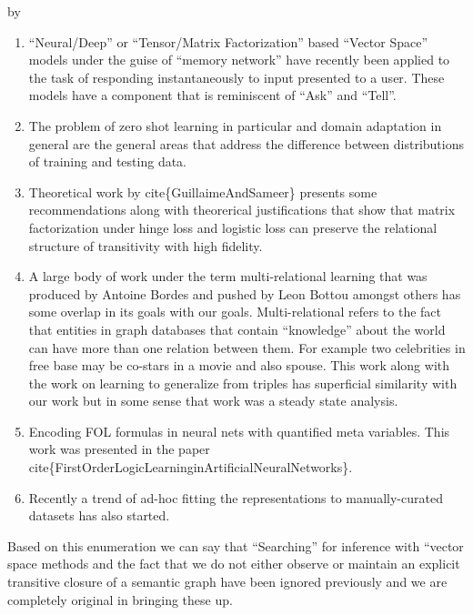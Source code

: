 \documentclass[12pt,answers]{exam} %
\makeatletter
\renewcommand{\cite}[1]{cite\{#1\}}
\def\SetTotalwidth{\advance\linewidth by \@totalleftmargin
\@totalleftmargin=0pt}
\newcommand{\answer}[1]{
\ifprintanswers
\SetTotalwidth
  \begin{solution}[0in]#1\end{solution}
\else \fi
}
\makeatother
\begin{document}
\begin{questions}
  \answer{
    \begin{enumerate}
    \item ``Neural/Deep'' or ``Tensor/Matrix Factorization'' based
      ``Vector Space'' models under the guise of ``memory network''
      have recently been applied to the task of responding
      instantaneously to input presented to a user. These models have
      a component that is reminiscent of ``Ask'' and ``Tell''.
    \item The problem of zero shot learning in particular and domain
      adaptation in general are the general areas that address the
      difference between distributions of training and testing data.
    \item Theoretical work by \cite{GuillaimeAndSameer} presents some
      recommendations along with theorerical justifications that show
      that matrix factorization under hinge loss and logistic loss can
      preserve the relational structure of transitivity with high
      fidelity.
    \item A large body of work under the term multi-relational
      learning that was produced by Antoine Bordes and pushed by Leon
      Bottou amongst others has some overlap in its goals with our
      goals. Multi-relational refers to the fact that entities in
      graph databases that contain ``knowledge'' about the world can
      have more than one relation between them. For example two
      celebrities in free base may be co-stars in a movie and also
      spouse. This work along with the work on learning to generalize
      from triples has superficial similarity with our work but in
      some sense that work was a steady state analysis.
    \item Encoding FOL formulas in neural nets with quantified meta
      variables. This work was presented in the paper
      \cite{FirstOrderLogicLearninginArtificialNeuralNetworks}.
    \item Recently a trend of ad-hoc fitting the representations to
      manually-curated datasets has also started.
    \end{enumerate}

    Based on this enumeration we can say that ``Searching'' for
    inference with ``vector space methods and the fact that we do not
    either observe or maintain an explicit transitive closure of a
    semantic graph have been ignored previously and we are completely
    original in bringing these up.  }


\end{questions}
\end{document}
